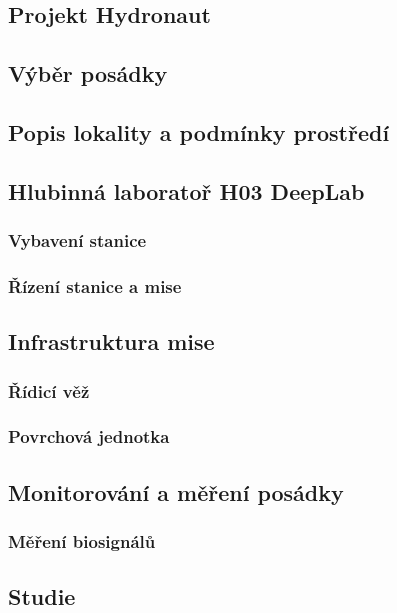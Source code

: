 \subsection{Projekt Hydronaut}
\label{subsec:projekt_hydronaut}

\subsection{Výběr posádky}
\label{subsec:vyber_posadky}

\subsection{Popis lokality a podmínky prostředí}
\label{subsec:diana_lokalita}

\subsection{Hlubinná laboratoř H03 DeepLab}
\label{subsubsec:h03_deeplab}

\subsubsection{Vybavení stanice}
\label{subsubsec:vybaveni_stanice}

\subsubsection{Řízení stanice a mise}
\label{subsubsec:rizeni_stanice_mise}

\subsection{Infrastruktura mise}
\label{subsec:infrastruktura_mise}

\subsubsection{Řídicí věž}
\label{subsubsec:ridici_vez}

\subsubsection{Povrchová jednotka}
\label{subsubsec:povrchova_jednotka}

\subsection{Monitorování a měření posádky}
\label{subsec:monitorovani posadky}

\subsubsection{Měření biosignálů}
\label{subsubsec:mereni_biosignalu}

\subsection{Studie}
\label{subsec:studie}
